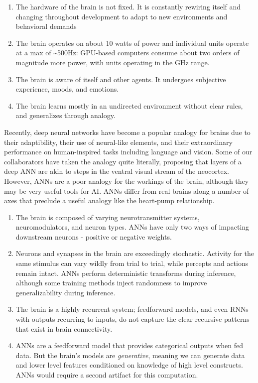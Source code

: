 \documentclass[
  letterpaper,
  DIV=11,
  numbers=noendperiod]{scrartcl}
\providecommand{\tightlist}{%
  \setlength{\itemsep}{0pt}\setlength{\parskip}{0pt}}\usepackage{longtable,booktabs,array}
\begin{document}
\begin{enumerate}
\def\labelenumi{\arabic{enumi}.}
\tightlist
\item
  The hardware of the brain is not fixed. It is constantly rewiring
  itself and changing throughout development to adapt to new
  environments and behavioral demands
\item
  The brain operates on about 10 watts of power and individual units
  operate at a max of \textasciitilde500Hz: GPU-based computers consume
  about two orders of magnitude more power, with units operating in the
  GHz range.
\item
  The brain is aware of itself and other agents. It undergoes subjective
  experience, moods, and emotions.
\item
  The brain learns mostly in an undirected environment without clear
  rules, and generalizes through analogy.
\end{enumerate}

Recently, deep neural networks have become a popular analogy for brains
due to their adaptibility, their use of neural-like elements, and their
extraordinary performance on human-inspired tasks including language and
vision. Some of our collaborators have taken the analogy quite
literally, proposing that layers of a deep ANN are akin to steps in the
ventral visual stream of the neocortex. However, ANNs are a poor analogy
for the workings of the brain, although they may be very useful tools
for AI. ANNs differ from real brains along a number of axes that
preclude a useful analogy like the heart-pump relationship.

\begin{enumerate}
\def\labelenumi{\arabic{enumi}.}
\item
  The brain is composed of varying neurotransmitter systems,
  neuromodulators, and neuron types. ANNs have only two ways of
  impacting downstream neurons - positive or negative weights.
\item
  Neurons and synapses in the brain are exceedingly stochastic. Activity
  for the same stimulus can vary wildly from trial to trial, while
  percepts and actions remain intact. ANNs perform deterministic
  transforms during inference, although some training methods inject
  randomness to improve generalizability during inference.
\item
  The brain is a highly recurrent system; feedforward models, and even
  RNNs with outputs recurring to inputs, do not capture the clear
  recursive patterns that exist in brain connectivity.
\item
  ANNs are a feedforward model that provides categorical outputs when
  fed data. But the brain's models are \emph{generative}, meaning we can
  generate data and lower level features conditioned on knowledge of
  high level constructs. ANNs would require a second artifact for this
  computation.
\end{enumerate}
\end{document}
